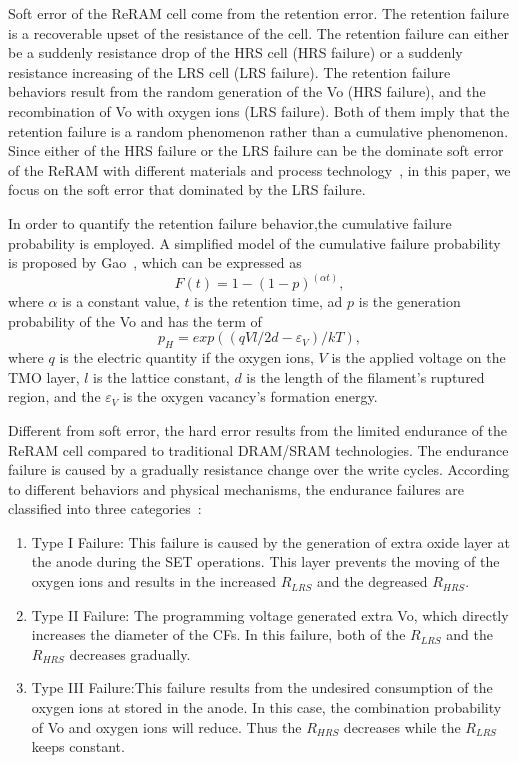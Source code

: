 Soft error of the ReRAM cell come from the retention error. The retention failure is a recoverable upset of the resistance of the cell. The retention failure can either be a suddenly resistance drop of the HRS cell (HRS failure) or a suddenly resistance increasing of the LRS cell (LRS failure). The retention failure behaviors result from the random generation of the Vo (HRS failure), and the recombination of Vo with oxygen ions (LRS failure). Both of them imply that the retention failure is a random phenomenon rather than a cumulative phenomenon. Since either of the HRS failure or the LRS failure can be the dominate soft error of the ReRAM with different materials and process technology~\cite{softerror_yu,softerror_gao}, in this paper, we focus on the soft error that dominated by the LRS failure.

In order to quantify the retention failure behavior,the cumulative failure probability is employed. A simplified model of the cumulative failure probability is proposed by Gao~\cite{softerror_gao}, which can be expressed as
\begin{equation}
F(t) = 1-(1-p)^{(\alpha t)},
\end{equation}
where $\alpha$ is a constant value, $t$ is the retention time, ad $p$ is the generation probability of the Vo and has the term of
\begin{equation}
p_H = exp((qVl/2d-\varepsilon_V)/kT),
\end{equation}
where $q$ is the electric quantity if the oxygen ions, $V$ is the applied voltage on the TMO layer, $l$ is the lattice constant, $d$ is the length of the filament's ruptured region, and the $\varepsilon_V$ is the oxygen vacancy's formation energy.

Different from soft error, the hard error results from the limited endurance of the ReRAM cell compared to traditional DRAM/SRAM technologies. The endurance failure is caused by a gradually resistance change over the write cycles. According to different behaviors and physical mechanisms, the endurance failures are classified into three categories~\cite{harderror}:
\begin{enumerate}
  \item Type I Failure: This failure is caused by the generation of extra oxide layer at the anode during the SET operations. This layer prevents the moving of the oxygen ions and results in the increased $R_{LRS}$ and the degreased $R_{HRS}$.
  \item Type II Failure: The programming voltage generated extra Vo, which directly increases the diameter of the CFs. In this failure, both of the $R_{LRS}$ and the $R_{HRS}$ decreases gradually.
  \item Type III Failure:This failure results from the undesired consumption of the oxygen ions at stored in the anode. In this case, the combination probability of Vo and oxygen ions will reduce. Thus the $R_{HRS}$ decreases while the $R_{LRS}$ keeps constant.
\end{enumerate}

